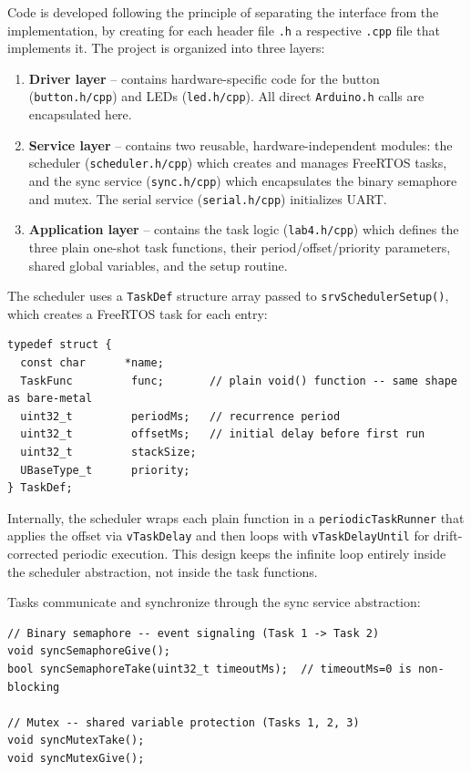 Code is developed following the principle of separating the interface from the
implementation, by creating for each header file \texttt{.h} a respective
\texttt{.cpp} file that implements it. The project is organized into three layers:

\begin{enumerate}
  \item \textbf{Driver layer} -- contains hardware-specific code for the button
    (\texttt{button.h/cpp}) and LEDs (\texttt{led.h/cpp}). All direct \texttt{Arduino.h} calls
    are encapsulated here.
  \item \textbf{Service layer} -- contains two reusable, hardware-independent modules:
    the scheduler (\texttt{scheduler.h/cpp}) which creates and manages FreeRTOS tasks, and
    the sync service (\texttt{sync.h/cpp}) which encapsulates the binary semaphore and mutex.
    The serial service (\texttt{serial.h/cpp}) initializes UART.
  \item \textbf{Application layer} -- contains the task logic (\texttt{lab4.h/cpp}) which defines
    the three plain one-shot task functions, their period/offset/priority parameters, shared global
    variables, and the setup routine.
\end{enumerate}

The scheduler uses a \texttt{TaskDef} structure array passed to \texttt{srvSchedulerSetup()},
which creates a FreeRTOS task for each entry:
\begin{lstlisting}
typedef struct {
  const char      *name;
  TaskFunc         func;       // plain void() function -- same shape as bare-metal
  uint32_t         periodMs;   // recurrence period
  uint32_t         offsetMs;   // initial delay before first run
  uint32_t         stackSize;
  UBaseType_t      priority;
} TaskDef;
\end{lstlisting}

Internally, the scheduler wraps each plain function in a \texttt{periodicTaskRunner} that
applies the offset via \texttt{vTaskDelay} and then loops with \texttt{vTaskDelayUntil}
for drift-corrected periodic execution. This design keeps the infinite loop entirely inside
the scheduler abstraction, not inside the task functions.

Tasks communicate and synchronize through the sync service abstraction:
\begin{lstlisting}
// Binary semaphore -- event signaling (Task 1 -> Task 2)
void syncSemaphoreGive();
bool syncSemaphoreTake(uint32_t timeoutMs);  // timeoutMs=0 is non-blocking

// Mutex -- shared variable protection (Tasks 1, 2, 3)
void syncMutexTake();
void syncMutexGive();
\end{lstlisting}

